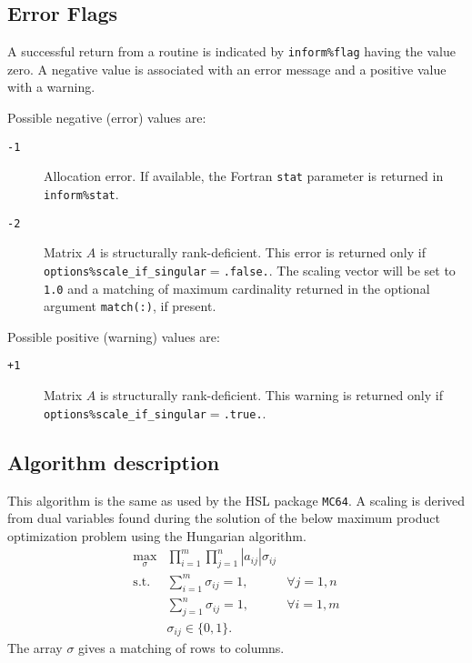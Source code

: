 \subsection{Error Flags} \label{returns:hungarian}
A successful return from a routine is indicated by \texttt{inform\%flag} having the value zero. A negative value is associated with an error message and a positive value with a warning.

Possible negative (error) values are:
\begin{description}
\item[\texttt{-1}] Allocation error. If available, the Fortran \texttt{stat} parameter is returned in \texttt{inform\%stat}.
\item[\texttt{-2}] Matrix $A$ is structurally rank-deficient. This error is
   returned only if
   \texttt{options\%scale\_if\_singular}$=$\texttt{.false.}. The scaling vector
   will be set to \texttt{1.0} and a matching of maximum cardinality returned
   in the optional argument \texttt{match(:)}, if present.
\end{description}

Possible positive (warning) values are:
\begin{description}
\item[\texttt{+1}] Matrix $A$ is structurally rank-deficient. This warning is
   returned only if
   \texttt{options\%scale\_if\_singular}$=$\texttt{.true.}.
\end{description}

\subsection{Algorithm description}

This algorithm is the same as used by the HSL package \texttt{MC64}. A scaling
is derived from dual variables found during the solution of the below
maximum product optimization problem using the Hungarian algorithm.
\begin{eqnarray*}
   \max_{\sigma} & \prod_{i=1}^m\prod_{j=1}^n |a_{ij}|\sigma_{ij} & \\
   \mathrm{s.t.} & \sum_{i=1}^m\sigma_{ij} = 1, & \forall j=1,n \\
                 & \sum_{j=1}^n\sigma_{ij} = 1, & \forall i=1,m \\
                 & \sigma_{ij} \in \{0,1\}.
\end{eqnarray*}
The array $\sigma$ gives a matching of rows to columns.

